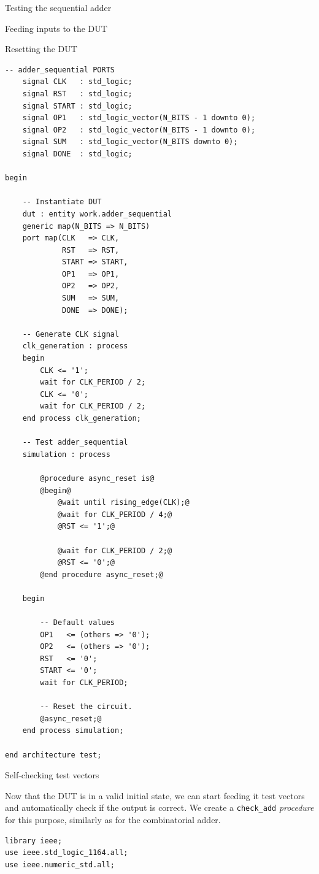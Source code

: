 \documentclass[lab]{course}
\begin{document}
\begin{section}{Testing the sequential adder}
\begin{subsection}{Feeding inputs to the DUT}
\begin{subsubsection}{Resetting the DUT}
\begin{lstlisting}[caption={Add \emph{asynchronous} reset}, label={lst:sequential_process_simulation_async_reset}]
    -- adder_sequential PORTS
    signal CLK   : std_logic;
    signal RST   : std_logic;
    signal START : std_logic;
    signal OP1   : std_logic_vector(N_BITS - 1 downto 0);
    signal OP2   : std_logic_vector(N_BITS - 1 downto 0);
    signal SUM   : std_logic_vector(N_BITS downto 0);
    signal DONE  : std_logic;

begin

    -- Instantiate DUT
    dut : entity work.adder_sequential
    generic map(N_BITS => N_BITS)
    port map(CLK   => CLK,
             RST   => RST,
             START => START,
             OP1   => OP1,
             OP2   => OP2,
             SUM   => SUM,
             DONE  => DONE);

    -- Generate CLK signal
    clk_generation : process
    begin
        CLK <= '1';
        wait for CLK_PERIOD / 2;
        CLK <= '0';
        wait for CLK_PERIOD / 2;
    end process clk_generation;

    -- Test adder_sequential
    simulation : process

        @procedure async_reset is@
        @begin@
            @wait until rising_edge(CLK);@
            @wait for CLK_PERIOD / 4;@
            @RST <= '1';@

            @wait for CLK_PERIOD / 2;@
            @RST <= '0';@
        @end procedure async_reset;@

    begin

        -- Default values
        OP1   <= (others => '0');
        OP2   <= (others => '0');
        RST   <= '0';
        START <= '0';
        wait for CLK_PERIOD;

        -- Reset the circuit.
        @async_reset;@
    end process simulation;

end architecture test;
            \end{lstlisting}
        \end{subsubsection}

        \begin{subsubsection}{Self-checking test vectors}

            Now that the DUT is in a valid initial state, we can start feeding it test vectors and automatically check if the output is correct. We create a \verb+check_add+ \emph{procedure} for this purpose, similarly as for the combinatorial adder.

            \begin{lstlisting}[caption={Add test vectors}, label={lst:sequential_process_simulation_test_vectors}]
library ieee;
use ieee.std_logic_1164.all;
use ieee.numeric_std.all;


\end{lstlisting}
\end{subsubsection}
\end{subsection}
\end{section}
\end{document}
